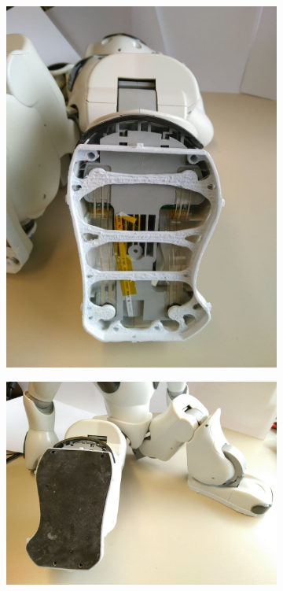 \begin{figure}[tb]
	\hfill
	\begin{subfigure}[c]{0.35\linewidth}
		\centering
		\includegraphics[width=\linewidth]{Bilder/Schuh_an_NAO_ohne_Sohle.jpg}
	\end{subfigure}
	\hfill
	\begin{subfigure}[c]{0.622\linewidth}
		\centering
		\includegraphics[width=\linewidth]{Bilder/Schuh_an_NAO_mit_Sohle.jpg}

\end{subfigure}
\end{figure}
